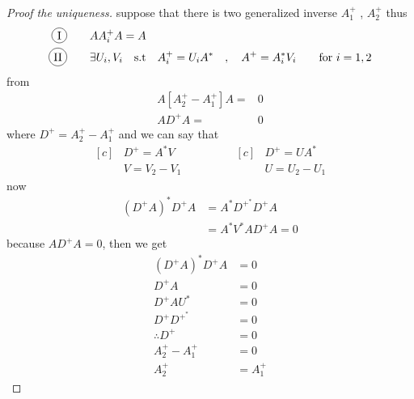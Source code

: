 \documentclass[]{article}
\begin{document}
\begin{proof}[Proof the uniqueness]
        suppose that there is two generalized inverse $A_1^{+}$ , $A_2^{+}$ thus
        \begin{align*}
                \circled{I}& \dquad AA_i^{+}A = A
                \\
                \circled{II}& \dquad \exists  U_i,V_i \quad \text{s.t} \quad A_i^{+} = U_i A^{*} \quad,\quad A^{+} = A_i^{*}V_i \dquad \text{for }i=1,2
        \end{align*}
from  
\begin{align*}
        A[A_2^{+}-A_1^{+}]A =& 0
        \\
        AD^{+}A=&0
\end{align*}
where $D^{+} = A_2^{+}-A_1^{+}$ and we can say that 
\begin{equation*}
        \begin{aligned}[c]
            &D^{+} = A^{*}V
            \\
            &V = V_2-V_1
        \end{aligned}
        \qquad\qquad
        \begin{aligned}[c]
        &D^{+} = UA^{*}
        \\
        &U = U_2-U_1
        \end{aligned}
    \end{equation*}
now
\begin{align*}
        (D^{+}A)^{*}D^{+}A &= A^* D^{+^{\textstyle *}} D^{+} A
        \\
        &= A^* V^{*}A D^{+} A = 0
\end{align*}
because $AD^{+}A=0$, then we get 
\begin{align*}
        (D^{+}A)^{*}D^{+}A &= 0
        \\
        D^{+}A &= 0
        \\
        D^{+}A U^*&= 0
        \\
        D^{+}D^{+^{\textstyle *}}&= 0
        \\
        \therefore D^{+} &= 0
        \\
        A_2^{+}-A_1^{+} &= 0
        \\
        A_2^{+} &=A_1^{+}
\end{align*}
\end{proof}
\end{document}
